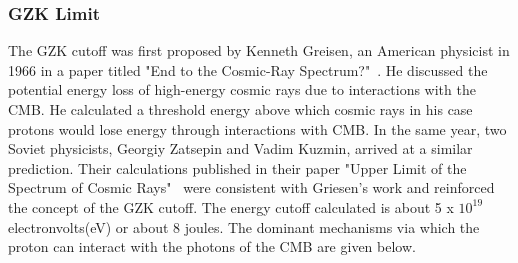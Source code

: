 \subsubsection{GZK Limit}
\label{subsubsec:GZK} 
The GZK cutoff was first proposed by Kenneth Greisen, an American physicist in 1966 in a paper titled "End to the Cosmic-Ray Spectrum?"~\cite{PhysRevLett.16.748}. He discussed the potential energy loss of high-energy cosmic rays due to interactions with the CMB. He calculated a threshold energy above which cosmic rays in his case protons would lose energy through interactions with CMB. In the same year, two Soviet physicists, Georgiy Zatsepin and Vadim Kuzmin, arrived at a similar prediction. Their calculations published in their paper "Upper Limit of the Spectrum of Cosmic Rays"~\cite{Zatsepin:1966jv} were consistent with Griesen's work and reinforced the concept of the GZK cutoff.  
The energy cutoff calculated is about 5 x $10^{19}$ electronvolts(eV) or about 8 joules. The dominant mechanisms via which the proton can interact with the photons of the CMB are given below. 

